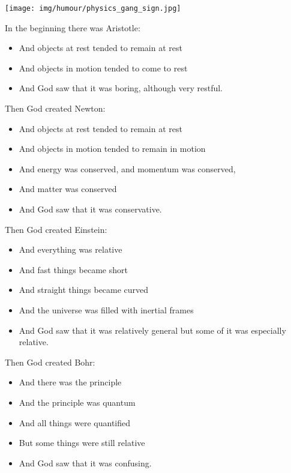 	\begin{center}
		\texttt{[image: img/humour/physics\_gang\_sign.jpg]}
	\end{center}
	\pagebreak

\begin{center}\underline{\hspace{5 cm}}\end{center}

In the beginning there was Aristotle:
\begin{itemize}
	\item And objects at rest tended to remain at rest
	\item And objects in motion tended to come to rest
	\item And God saw that it was boring, although very restful.
\end{itemize}

Then God created Newton:
\begin{itemize}
	\item And objects at rest tended to remain at rest
	\item And objects in motion tended to remain in motion
	\item And energy was conserved, and momentum was conserved,
	\item And matter was conserved
	\item And God saw that it was conservative.
\end{itemize}

Then God created Einstein:
\begin{itemize}
	\item And everything was relative
	\item And fast things became short
	\item And straight things became curved
	\item And the universe was filled with inertial frames
	\item And God saw that it was relatively general
but some of it was especially relative.
\end{itemize}

Then God created Bohr:
\begin{itemize}
	\item And there was the principle
	\item And the principle was quantum
	\item And all things were quantified
	\item But some things were still relative
	\item And God saw that it was confusing.
\end{itemize}

